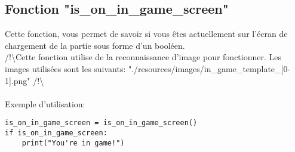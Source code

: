 \newpage

\subsection{Fonction "is\_on\_in\_game\_screen"}
Cette fonction, vous permet de savoir si vous êtes actuellement sur l'écran de chargement de la partie sous forme d'un booléen.
\\/!\textbackslash Cette fonction utilise de la reconnaissance d'image pour fonctionner. Les images utilisées sont les suivants: "./resources/images/in\_game\_template\_[0-1].png" /!\textbackslash \\\\
Exemple d'utilisation:

\begin{verbatim}
is_on_in_game_screen = is_on_in_game_screen()
if is_on_in_game_screen:
    print("You're in game!")
\end{verbatim}